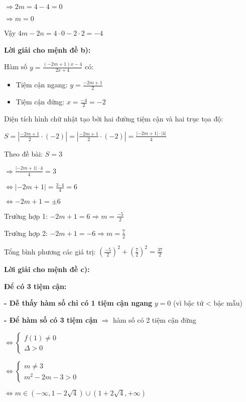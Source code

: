 \documentclass{article}
\begin{document}
\(\Rightarrow 2m = 4 - 4 = 0\)

\(\Rightarrow m = 0\)

Vậy \(4m - 2n = 4 \cdot 0 - 2 \cdot 2 = -4\)

\textbf{Lời giải cho mệnh đề b):}

Hàm số \(y = \frac{(-2m + 1)x - 4}{2x + 4}\) có:

\begin{itemize}
\item Tiệm cận ngang: \(y = \frac{-2m + 1}{2}\)
\item Tiệm cận đứng: \(x = \frac{-4}{2} = -2\)
\end{itemize}

Diện tích hình chữ nhật tạo bởi hai đường tiệm cận và hai trục tọa độ:

\(S = \left| \frac{-2m + 1}{2} \cdot (-2) \right| = \left| \frac{-2m + 1}{2} \cdot (-2) \right| = \frac{|-2m + 1| \cdot |4|}{4}\)

Theo đề bài: \(S = 3\)

\(\Rightarrow \frac{|-2m + 1| \cdot 4}{4} = 3\)

\(\Leftrightarrow |-2m + 1| = \frac{3 \cdot 4}{4} = 6\)

\(\Leftrightarrow -2m + 1 = \pm 6\)

Trường hợp 1: \(-2m + 1 = 6 \Rightarrow m = \frac{-5}{2}\)

Trường hợp 2: \(-2m + 1 = -6 \Rightarrow m = \frac{7}{2}\)

Tổng bình phương các giá trị: \((\frac{-5}{2})^2 + (\frac{7}{2})^2 = \frac{37}{2}\)

\textbf{Lời giải cho mệnh đề c):}

\textbf{Để có 3 tiệm cận:}

\textbf{- Dễ thấy hàm số chỉ có 1 tiệm cận ngang} \(y = 0\) (vì bậc tử < bậc mẫu)

\textbf{- Để hàm số có 3 tiệm cận} \(\Rightarrow\) hàm số có 2 tiệm cận đứng

\(\Leftrightarrow \begin{cases}
f(1) \neq 0 \\
\Delta > 0
\end{cases}\)

\(\Leftrightarrow \begin{cases}
m \neq 3 \\
m^2 - 2m - 3 > 0
\end{cases}\)

\(\Leftrightarrow m \in (-\infty, 1 - 2\sqrt{4}) \cup (1 + 2\sqrt{4}, +\infty)\)
\end{document}
